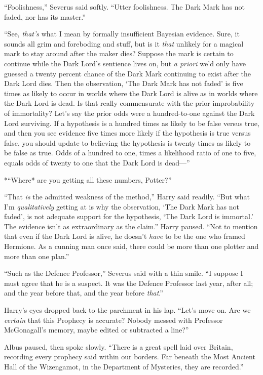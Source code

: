``Foolishness,'' Severus said softly. ``Utter foolishness. The Dark Mark
has not faded, nor has its master.''

``See, \emph{that's} what I mean by formally insufficient Bayesian
evidence. Sure, it sounds all grim and foreboding and stuff, but is it
\emph{that} unlikely for a magical mark to stay around after the maker
dies? Suppose the mark is certain to continue while the Dark Lord's
sentience lives on, but \emph{a priori} we'd only have guessed a twenty
percent chance of the Dark Mark continuing to exist after the Dark Lord
dies. Then the observation, `The Dark Mark has not faded' is five times
as likely to occur in worlds where the Dark Lord is alive as in worlds
where the Dark Lord is dead. Is that really commensurate with the prior
improbability of immortality? Let's say the prior odds were a
hundred-to-one against the Dark Lord surviving. If a hypothesis is a
hundred times as likely to be false versus true, and then you see
evidence five times more likely if the hypothesis is true versus false,
you should update to believing the hypothesis is twenty times as likely
to be false as true. Odds of a hundred to one, times a likelihood ratio
of one to five, equals odds of twenty to one that the Dark Lord is
dead---''

*``Where* are you getting all these numbers, Potter?''

``That \emph{is} the admitted weakness of the method,'' Harry said
readily. ``But what I'm \emph{qualitatively} getting at is why the
observation, `The Dark Mark has not faded', is not adequate support for
the hypothesis, `The Dark Lord is immortal.' The evidence isn't as
extraordinary as the claim.'' Harry paused. ``Not to mention that even
if the Dark Lord is alive, he doesn't \emph{have} to be the one who
framed Hermione. As a cunning man once said, there could be more than
one plotter and more than one plan.''

``Such as the Defence Professor,'' Severus said with a thin smile. ``I
suppose I must agree that he is a suspect. It was the Defence Professor
last year, after all; and the year before that, and the year before
\emph{that}.''

Harry's eyes dropped back to the parchment in his lap. ``Let's move on.
Are we \emph{certain} that this Prophecy is accurate? Nobody messed with
Professor McGonagall's memory, maybe edited or subtracted a line?''

Albus paused, then spoke slowly. ``There is a great spell laid over
Britain, recording every prophecy said within our borders. Far beneath
the Most Ancient Hall of the Wizengamot, in the Department of Mysteries,
they are recorded.''

